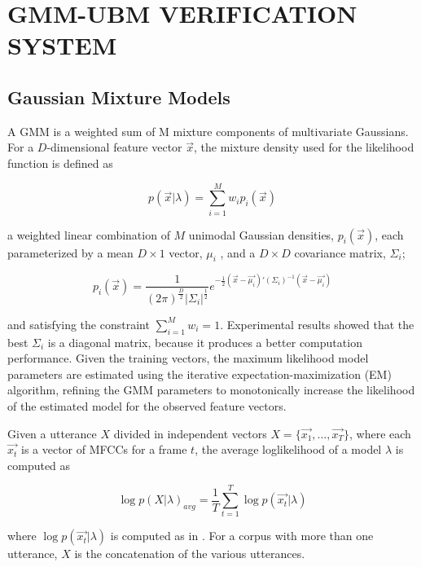 \documentclass[a4paper,twocolumn]{article}
\begin{document}
\section{GMM-UBM VERIFICATION SYSTEM}

\subsection{Gaussian Mixture Models}

A GMM is a weighted sum of M mixture components of multivariate Gaussians. For a $D$-dimensional feature vector $\vec{x}$, the mixture density used for the likelihood function is defined as

\begin{equation}
    \label{eq:gmm_likelihood}
    p(\vec{x}|\lambda) = \sum_{i=1}^M w_i p_i(\vec{x})
\end{equation}

\noindent a weighted linear combination of $M$ unimodal Gaussian densities, $p_i(\vec{x})$, each parameterized by a mean $D\times 1$ vector, $\mu_i$ , and a $D\times D$ covariance matrix, $\Sigma_i$;

\begin{equation}
    \label{eq:gmm}
    p_i(\vec{x}) = \frac{1}{(2\pi)^\frac{D}{2}|\Sigma_i|^\frac{1}{2}}e^{-\frac{1}{2}(\vec{x} - \vec{\mu_i})'(\Sigma_i)^{-1}(\vec{x} - \vec{\mu_i})}
\end{equation}

\noindent and satisfying the constraint $\sum_{i=1}^M w_i = 1$. Experimental results showed that the best $\Sigma_i$ is a diagonal matrix, because it produces a better computation performance. Given the training vectors, the maximum likelihood model parameters are estimated using the iterative expectation-maximization (EM) algorithm, refining the GMM parameters to monotonically increase the likelihood of the estimated model for the observed feature vectors.

Given a utterance $X$ divided in independent vectors $X = \{\vec{x_1}, \dots, \vec{x_T}\}$, where each $\vec{x_t}$ is a vector of MFCCs for a frame $t$, the average loglikelihood of a model $\lambda$ is computed as

\begin{equation}
    \label{eq:loglikelihood_lambda}
    \log p(X|\lambda)_{avg} = \frac{1}{T}\sum_{t=1}^T \log p(\vec{x_t}|\lambda)
\end{equation}

\noindent where $\log p(\vec{x_t}|\lambda)$ is computed as in . For a corpus with more than one utterance, $X$ is the concatenation of the various utterances.
\end{document}
